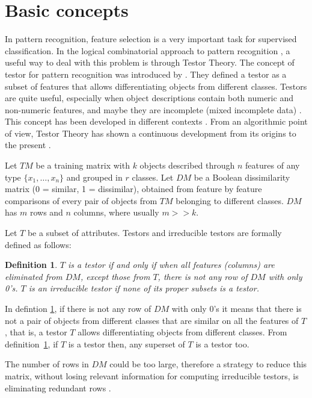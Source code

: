 \documentclass[authoryear,preprint,review,12pt]{elsarticle}
\newtheorem{definition}{Definition}
\begin{document}
\section{Basic concepts}
\label{sect:2}

In pattern recognition, feature selection is a very important task for supervised classification. In the logical
 combinatorial approach to pattern recognition \citep{R5}, a useful
way to deal with this problem is through Testor Theory. The concept of testor for pattern recognition was
introduced by \cite{R12}. They defined a testor as a subset of features that allows
differentiating objects from different classes. Testors are quite useful, especially when object descriptions
contain both numeric and non-numeric features, and maybe they are incomplete (mixed incomplete data)
\citep{R5}. This concept has been developed in different contexts \citep{R1}. From an 
algorithmic point of view, Testor Theory has shown a continuous development from its origins to the present 
\citep{R31,R13,R23}.

Let $TM$ be a training matrix with $k$ objects described through $n$
features of any type $\{x_{1},\ldots,x_{n}\}$ and grouped in $r$
classes. Let $DM$ be a Boolean dissimilarity matrix (0 = similar, 1 =
dissimilar), obtained from feature by feature comparisons of every
pair of objects from $TM$ belonging to different classes. $DM$ has
$m$ rows and $n$ columns, where usually $m>>k$.

Let $T$ be a subset of attributes. Testors and irreducible testors are formally defined as follows:

\begin{definition} \label{def1}
$T$ is a testor if and only if when all
features (columns) are eliminated from $DM$, except those from $T$, there is
not any row of $DM$ with only 0's. $T$ is an irreducible testor if none of its proper subsets is a testor.
\end{definition}

In defintion \ref{def1}, if there is not any row of $DM$ with only
0's it means that there is not a pair of objects from different
classes that are similar on all the features of $T$, that is, a
testor $T$ allows differentiating objects from different
classes. From definition~\ref{def1}, if $T$ is a testor then, any superset of $T$ is a testor too.

The number of rows in $DM$ could be too large, therefore a strategy to reduce this matrix, without losing
relevant information for computing irreducible testors, is eliminating redundant rows \citep{R1}.
\end{document}

